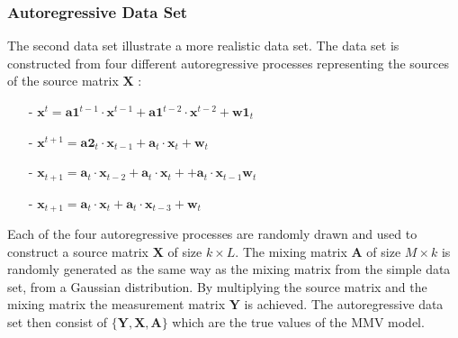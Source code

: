 \subsubsection{Autoregressive Data Set}
The second data set illustrate a more realistic data set.
The data set is constructed from four different autoregressive processes representing the sources of the source matrix $\mathbf{X}$ : 
\begin{itemize}
\item[-] $\mathbf{x}^{t} = \mathbf{a1}^{t-1} \cdot \mathbf{x}^{t-1} + \mathbf{a1}^{t-2} \cdot \mathbf{x}^{t-2} + \mathbf{w1}_t$
\item[-] $\mathbf{x}^{t+1} = \mathbf{a2}_t \cdot \mathbf{x}_{t-1} + \mathbf{a}_t \cdot \mathbf{x}_t + \mathbf{w}_t$
\item[-] $\mathbf{x}_{t+1} = \mathbf{a}_t \cdot \mathbf{x}_{t-2} + \mathbf{a}_t \cdot \mathbf{x}_t + + \mathbf{a}_t \cdot \mathbf{x}_{t-1} \mathbf{w}_t$
\item[-] $\mathbf{x}_{t+1} = \mathbf{a}_t \cdot \mathbf{x}_t + \mathbf{a}_t \cdot \mathbf{x}_{t-3} + \mathbf{w}_t$
\end{itemize}
Each of the four autoregressive processes are randomly drawn and used to construct a source matrix $\mathbf{X}$ of size $k \times L$. 
The mixing matrix $\mathbf{A}$ of size $M \times k$ is randomly generated as the same way as the mixing matrix from the simple data set, from a Gaussian distribution. 
By multiplying the source matrix and the mixing matrix the measurement matrix $\mathbf{Y}$ is achieved.
The autoregressive data set then consist of $\{ \mathbf{Y}, \mathbf{X}, \mathbf{A} \}$ which are the true values of the MMV model.

